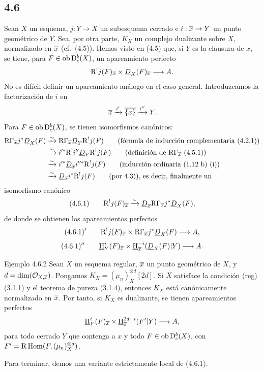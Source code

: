 \subsection*{4.6}
Sean $X$ un esquema, $j:Y\to X$ un subesquema cerrado e $i:\overline{x}\to Y$ un punto geométrico de $Y$. Sea, por otra parte, $K_X$ un complejo dualizante sobre $X$, normalizado en $\overline{x}$ (cf.~(4.5)). Hemos visto en (4.5) que, si $Y$ es la clausura de $x$, se tiene, para $F\in\operatorname{ob}\mathrm{D}_c^b(X)$, un apareamiento perfecto
\[
\mathrm{R}^{!}j(F)_{\overline{x}}\times \underline{D}_X(F)_{\overline{x}}\longrightarrow A.
\]
No es difícil definir un apareamiento análogo en el caso general. Introduzcamos la factorización de $i$ en
\[
\overline{x}\xrightarrow{i'}\overline{\{x\}}\xrightarrow{i''}Y.
\]
Para $F\in\operatorname{ob}\mathrm{D}_c^b(X)$, se tienen isomorfismos canónicos:
\[
\begin{aligned}
\mathrm{R}\Gamma_{\overline{x}}j^*\underline{D}_X(F)&\xrightarrow{\sim}\mathrm{R}\Gamma_{\overline{x}}\underline{D}_Y\mathrm{R}^{!}j(F)\qquad\text{(fórmula de inducción complementaria (4.2.1))}\\
&\xrightarrow{\sim}i'^*\mathrm{R}^{!}i''\underline{D}_Y\mathrm{R}^{!}j(F)\qquad\text{(definición de $\mathrm{R}\Gamma_{\overline{x}}$ (4.5.1))}\\
&\xrightarrow{\sim}i'^*\underline{D}_{\overline{x}}i''^*\mathrm{R}^{!}j(F)\qquad\text{(inducción ordinaria (1.12 b) (i))}\\
&\xrightarrow{\sim}\underline{D}_{\overline{x}}i^*\mathrm{R}^{!}j(F)\qquad\text{(por 4.3)), es decir, finalmente un}
\end{aligned}
\]
isomorfismo canónico
\[
(4.6.1)\qquad \mathrm{R}^{!}j(F)_{\overline{x}}\xrightarrow{\sim}\underline{D}_{\overline{x}}\mathrm{R}\Gamma_{\overline{x}}j^*\underline{D}_X(F),
\]
de donde se obtienen los apareamientos perfectos
\[
(4.6.1)'\qquad \mathrm{R}^{!}j(F)_{\overline{x}}\times \mathrm{R}\Gamma_{\overline{x}}j^*\underline{D}_X(F)\longrightarrow A,
\]
\[
(4.6.1)''\qquad \underline{\mathrm H}_Y^i(F)_{\overline{x}}\times \underline{\mathrm H}_{\overline{x}}^{-i}(\underline{D}_X(F)|Y)\longrightarrow A.
\]

\begin{statement}{Ejemplo 4.6.2}
Sean $X$ un esquema regular, $\overline{x}$ un punto geométrico de $X$, y $d=\dim(\mathcal{O}_{X,\overline{x}})$. Pongamos $K_X=(\mu_n)_X^{\otimes d}[2d]$. Si $X$ satisface la condición (reg) (3.1.1) y el teorema de pureza (3.1.4), entonces $K_X$ está canónicamente normalizado en $\overline{x}$. Por tanto, si $K_X$ es dualizante, se tienen apareamientos perfectos
\[
\underline{\mathrm H}_Y^i(F)_{\overline{x}}\times \underline{\mathrm H}_{\overline{x}}^{2d-i}(F'|Y)\longrightarrow A,
\]
para todo cerrado $Y$ que contenga a $x$ y todo $F\in\operatorname{ob}\mathrm{D}_c^b(X)$, con $F'=\mathrm{R}\operatorname{Hom}(F,(\mu_n)_X^{\otimes d})$.
\end{statement}

Para terminar, demos una variante estrictamente local de (4.6.1).
